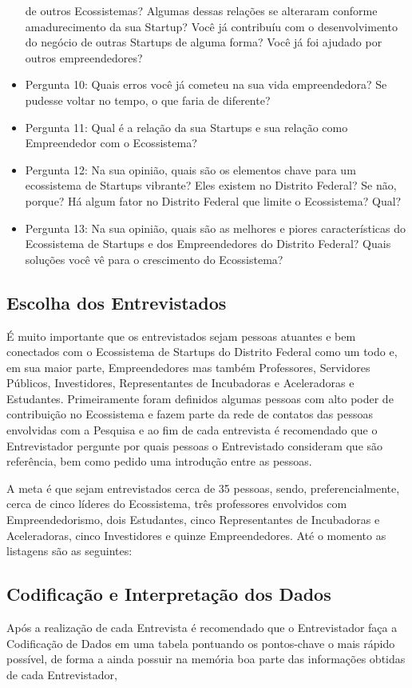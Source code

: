 \begin{itemize}
  de outros Ecossistemas? Algumas dessas relações se alteraram conforme amadurecimento da sua Startup? Você já contribuíu com o desenvolvimento do negócio de outras Startups de alguma forma? Você
  já foi ajudado por outros empreendedores?
  \item Pergunta 10: Quais erros você já cometeu na sua vida empreendedora? Se pudesse voltar no tempo, o que faria de diferente?
  \item Pergunta 11: Qual é a relação da sua Startups e sua relação como Empreendedor com o Ecossistema?
  \item Pergunta 12: Na sua opinião, quais são os elementos chave para um ecossistema de Startups vibrante? Eles existem no Distrito Federal? Se não, porque? Há algum fator no Distrito Federal que
  limite o Ecossistema? Qual?
  \item Pergunta 13: Na sua opinião, quais são as melhores e piores características do Ecossistema de Startups e dos Empreendedores do Distrito Federal? Quais soluções você vê para o crescimento do
  Ecossistema?
\end{itemize}

\subsection{Escolha dos Entrevistados}
\label{subsection:escolha_dos_entrevistados}

É muito importante que os entrevistados sejam pessoas atuantes e bem conectados com o Ecossistema de Startups do Distrito Federal como um todo e, em sua maior parte, Empreendedores mas também
Professores, Servidores Públicos, Investidores, Representantes de Incubadoras e Aceleradoras e Estudantes. Primeiramente foram definidos algumas pessoas com alto poder de contribuição no Ecossistema
e fazem parte da rede de contatos das pessoas envolvidas com a Pesquisa e ao fim de cada entrevista é recomendado que o Entrevistador pergunte por quais pessoas o Entrevistado consideram que são
referência, bem como pedido uma introdução entre as pessoas.

A meta é que sejam entrevistados cerca de 35 pessoas, sendo, preferencialmente, cerca de cinco líderes do Ecossistema, três professores envolvidos com Empreendedorismo,
dois Estudantes, cinco Representantes de Incubadoras e Aceleradoras, cinco Investidores e quinze Empreendedores. Até o momento as listagens são as seguintes:

\subsection{Codificação e Interpretação dos Dados}
\label{subsection:codificacao_e_interpretacao_dos_dados}


Após a realização de cada Entrevista é recomendado que o Entrevistador faça a Codificação de Dados em uma tabela pontuando os pontos-chave o mais rápido possível, de forma a ainda possuir na memória
boa parte das informações obtidas de cada Entrevistador,
